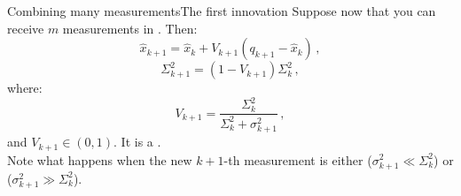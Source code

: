 \begin{frame}{Combining many measurements}{The first innovation}
  Suppose now that you can receive $m$ measurements in . Then:
  \begin{equation}
    \hat{x}_{k+1} = \hat{x}_k + V_{k+1}(q_{k+1} - \hat{x}_k)\,,
  \end{equation}
  \begin{equation}
    \Sigma_{k+1}^2 = (1 - V_{k+1})\Sigma_k^2\,,
  \end{equation}
  where:
  \begin{equation}
    V_{k+1} = \frac{\Sigma_k^2}{\Sigma_k^2 + \sigma_{k+1}^2}\,,
  \end{equation}
  and $V_{k+1} \in (0,1)$. It is a .\\
  Note what happens when the new $k+1$-th measurement is either  ($\sigma_{k+1}^2 \ll \Sigma_k^2$) or  ($\sigma_{k+1}^2 \gg \Sigma_k^2$).
\end{frame}

